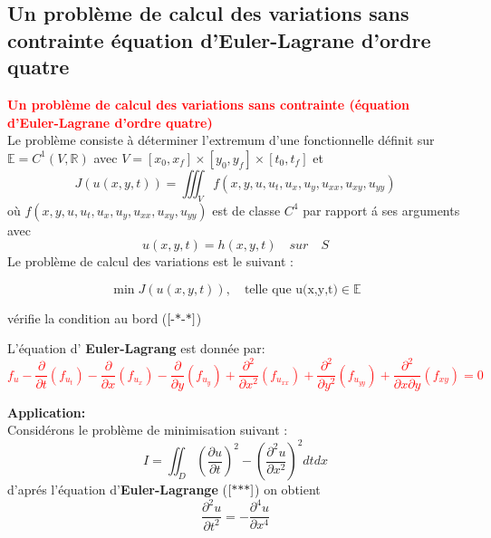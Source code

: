 \documentclass[12pt]{beamer}
\begin{document}
\subsection*{Un probl\`{e}me de calcul des variations sans contrainte \'{e}quation d'Euler-Lagrane d'ordre quatre}
\begin{frame}
\textcolor{red}{
\textbf{Un probl\`{e}me de calcul des variations sans contrainte (\'{e}quation d'Euler-Lagrane d'ordre quatre)}}\\
Le probl\`{e}me consiste \`{a} déterminer l'extremum d'une fonctionnelle d\'{e}finit sur $ \mathbb{E}=C^{1}(V,\mathbb{R})$ avec $V=[x_{0},x_{f}]\times [y_{0},y_{f}]\times [t_{0},t_{f}] $ et
\begin{equation}
J(u(x,y,t))=\iiint_{V}f(x,y,u,u_{t},u_{x},u_{y},u_{xx},u_{xy},u_{yy})
\end{equation} 
o\`{u} $f(x,y,u,u_{t},u_{x},u_{y},u_{xx},u_{xy},u_{yy})$ est de classe $ C^{4}$ par rapport \'{a} ses arguments avec
\begin{equation}
u(x,y,t)=h(x,y,t) \quad sur \quad S\label{-*-*}\end{equation}
Le problème de calcul des variations est le suivant :
\begin{block}{}
\begin{equation}
\min   J(u(x,y,t)),\quad \text{telle que u(x,y,t)$\in\mathbb{ E} $}\label{0123} \end{equation}
\end{block}
vérifie la condition au bord ($\ref{-*-*}$)\\

\end{frame}
\begin{frame}
\begin{block}
	
	L'\'{e}quation d'\textbf{ Euler-Lagrang} est donn\'{e}e par:
\textcolor{red}{\begin{equation}
f_{u}-\dfrac{\partial }{\partial t}(f_{u_{t}})-\dfrac{\partial }{\partial x}(f_{u_{x}})-\dfrac{\partial }{\partial y}(f_{u_{y}})+\dfrac{\partial^{2} }{\partial x ^{2}}(f_{u_{xx}})+\dfrac{\partial^{2} }{\partial y^{2}}(f_{u_{yy}})+\dfrac{\partial^{2}}{\partial{x}\partial{y}}(f_{xy})=0
\label{***} \end{equation}}
\end{block}
\textbf{\large {Application:}}\\
Consid\'{e}rons le probl\`{e}me de minimisation suivant :
\begin{equation}
I=\iint_{D}(\dfrac{\partial u}{\partial t})^{2}-(\dfrac{\partial ^{2}u}{\partial x^{2}})^{2}dt dx
\end{equation}
d'apr\'{e}s l'\'{e}quation d'\textbf{Euler-Lagrange} ($\ref{***}$) on obtient 
\begin{equation}  
\dfrac{\partial ^{2}u}{\partial t^{2}}=-\dfrac{\partial ^{4}u}{\partial x^{4}}
\label{2*} \end{equation}
\end{frame}
\end{document}
